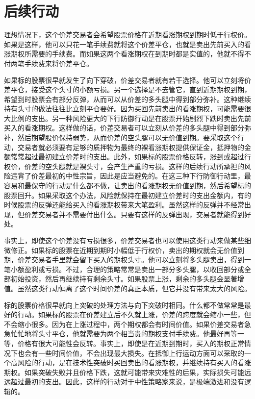 \documentclass{article}
\begin{document}
\section{后续行动}
理想情况下，这个价差交易者会希望股票价格在近期看涨期权到期时低于行权价。如果是这样，他可以只花一笔手续费就将这个价差平仓，也就是卖出先前买入的看涨期权所需要的手续费。而如果这两个看涨期权在到期时都是实值的，他就不得不付两笔手续费来将价差平仓。

如果标的股票很早就发生了向下穿破，价差交易者就有若干选择。他可以立刻将价差平仓，接受这个头寸的小额亏损。另一个选择是不去管它，直到近期期权到期，希望到时股票会有部分反弹，从而可以从价差的多头腿中得到部分弥补。这种继续持有头寸的做法往往比立刻平仓要好。因为买回先前卖出的看涨期权，可能需要很大比例的支出。另一种风险更大的下行防御行动是在股票开始剧烈下跌时卖出先前买入的看涨期权。这样做的话，价差交易者可以立刻从价差的多头腿中得到部分弥补，然后期望股价保持弱势，从而价差的空头腿可以无价值到期。要采取这个行动，交易者就必须要有足够的质押物为最终的裸看涨期权提供保证金，抵押物的金额常常超过最初建立价差时的支出。此外，如果标的股票价格反转，涨到或超过行权价，价差的空头腿就是裸头寸，会产生严重的亏损。这样的后续行动所承担的风险违背了价差最初的中性宗旨，因此是应当避免的。在这三种下行防御行动里，最容易和最保守的行动是什么都不做，让卖出的看涨期权无价值到期，然后希望标的股票回升。如果采取这个办法，风险就保持在最初建立价差时的支出金额内，有的时候股票的反弹还能给买入的看涨期权带来大笔盈利。虽然这样的反弹并不经常出现，但价差交易者并不需要付出什么。只要有这样的反弹出现，交易者就能得到好处。

事实上，即使这个价差没有亏损很多，价差交易者也可以使用这类行动来做某些细微修正。如果标的股票在近期到期时小幅低于行权价，卖出的期权就会无价值到期，价差交易者手里就会留下买入的期权头寸。他可以立刻将多头腿卖出，得到一笔小额盈利或亏损。不过，合理的策略常常是卖出一部分多头腿，以收回部分或全部初始投资，然后再继续持有剩余头寸。如果股票上涨，剩余的多头腿会显著增值。虽然这类行动偏离了这个时间价差的真正本质，但它并没有带来太大的风险。

标的股票价格很早就向上突破的处理方法与向下突破时相同。什么都不做常常是最好的行动。如果标的股票在价差建立后不久就上涨，价差的跨度就会缩小一些，但不会缩小很多。因为在上涨过程中，两个期权都会有时间价值。如果价差交易者急急忙忙地将头寸平仓，他就需要为两个相当贵的期权支付手续费。他最好再等一等，价格有很大可能性会反转。事实上，即使是在近期到期时，买入的期权正常情况下也会有一些时间价值，不会出现最大损失。在抵御上行运动方面可以采取的一个高风险的行动，是在技术性突破时买回卖出的看涨期权，并继续持有买入的看涨期权。如果突破失败并且价格下跌，这就可能带来灾难性的后果，实际损失可能远远超过最初的支出。因此，这样的行动对于中性策略家来说，是极端激进和没有逻辑的。
\end{document}
